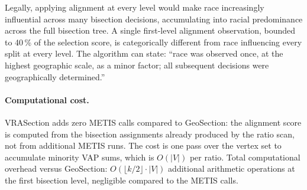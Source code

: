 Legally, applying alignment at every level would make race increasingly
influential across many bisection decisions, accumulating into racial
predominance across the full bisection tree.
A single first-level alignment observation, bounded to 40\,\% of the
selection score, is categorically different from race influencing every
split at every level.
The algorithm can state: ``race was observed once, at the highest geographic
scale, as a minor factor; all subsequent decisions were geographically
determined.''

\paragraph{Computational cost.}
VRASection adds zero METIS calls compared to GeoSection: the alignment
score is computed from the bisection assignments already produced by the
ratio scan, not from additional METIS runs.
The cost is one pass over the vertex set to accumulate minority VAP
sums, which is $O(|V|)$ per ratio.
Total computational overhead versus GeoSection:
$O(\lfloor k/2 \rfloor \cdot |V|)$ additional arithmetic operations
at the first bisection level, negligible compared to the METIS calls.
